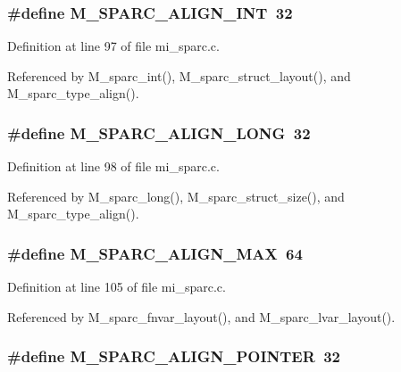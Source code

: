 \subsubsection{\setlength{\rightskip}{0pt plus 5cm}\#define M\_\-SPARC\_\-ALIGN\_\-INT~32}\label{mi__sparc_8c_9415095206395f5752b7274f54b54d70}




Definition at line 97 of file mi\_\-sparc.c.

Referenced by M\_\-sparc\_\-int(), M\_\-sparc\_\-struct\_\-layout(), and M\_\-sparc\_\-type\_\-align().
\subsubsection{\setlength{\rightskip}{0pt plus 5cm}\#define M\_\-SPARC\_\-ALIGN\_\-LONG~32}\label{mi__sparc_8c_fb42d0c5f81b921d1946728eebd0991f}




Definition at line 98 of file mi\_\-sparc.c.

Referenced by M\_\-sparc\_\-long(), M\_\-sparc\_\-struct\_\-size(), and M\_\-sparc\_\-type\_\-align().
\subsubsection{\setlength{\rightskip}{0pt plus 5cm}\#define M\_\-SPARC\_\-ALIGN\_\-MAX~64}\label{mi__sparc_8c_215ea536898a4336b4753081aecbf4fd}




Definition at line 105 of file mi\_\-sparc.c.

Referenced by M\_\-sparc\_\-fnvar\_\-layout(), and M\_\-sparc\_\-lvar\_\-layout().
\subsubsection{\setlength{\rightskip}{0pt plus 5cm}\#define M\_\-SPARC\_\-ALIGN\_\-POINTER~32}\label{mi__sparc_8c_1f57a3ae8aa5c4b9ef4a668987ea63f6}




